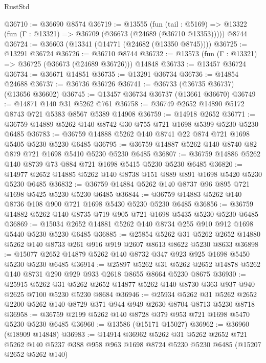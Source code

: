 \begin{lexlean}{RustStd}
\begin{coremodule}
@36710 := @36690 @8574
@36719 := @13555
    (fun (tail : @5169) => @13322 (fun (Γ : @13321) => @36709 (@36673 (@24689 (@36710 @13353)))))
    @8744
@36724 := @36603 (@13341 (@14771 (@24682 (@13350 @8745))))
@36725 := @13291 @36724
@36726 := @36710 @8744
@36732 := @13573 (fun (Γ : @13321) => @36725 (@36673 (@24689 @36726))) @14848
@36733 := @13457 @36724
@36734 := @36671 @14851
@36735 := @13291 @36734
@36736 := @14854 @24688
@36737 := @36736 @36726
@36741 := @36733 (@36735 @36737) (@13656 @36602)
@36745 := @13457 @36734 @36737 (@13661 @36670)
@36749 := @14871 @140 @31 @5262 @761
@36758 := @36749 @2652 @14890 @5172 @8743 @721 @5383 @8567 @5389 @14908
@36759 := @14918 @2652
@36771 := @36759 @14889 @5262 @140 @8742 @30 @755 @721 @1698 @5399 @5230 @5230 @6485
@36783 := @36759 @14888 @5262 @140 @8741 @22 @874 @721 @1698 @5405 @5230 @5230 @6485
@36795 := @36759 @14887 @5262 @140 @8740 @82 @879 @721 @1698 @5410 @5230 @5230 @6485
@36807 := @36759 @14886 @5262 @140 @8739 @73 @884 @721 @1698 @5415 @5230 @5230 @6485
@36820 := @14977 @2652 @14885 @5262 @140 @8738 @151 @889 @891 @1698 @5420 @5230 @5230 @6485
@36832 := @36759 @14884 @5262 @140 @8737 @96 @895 @721 @1698 @5425 @5230 @5230 @6485
@36844 := @36759 @14883 @5262 @140 @8736 @108 @900 @721 @1698 @5430 @5230 @5230 @6485
@36856 := @36759 @14882 @5262 @140 @8735 @719 @905 @721 @1698 @5435 @5230 @5230 @6485
@36869 := @15034 @2652 @14881 @5262 @140 @8734 @255 @910 @912 @1698 @5440 @5230 @5230 @6485
@36885 := @25854
    @5262
    @31
    @5262
    @2652
    @14880
    @5262
    @140
    @8733
    @261
    @916
    @919
    @2607
    @8613
    @8622
    @5230
    @8633
@36898 := @15077 @2652 @14879 @5262 @140 @8732 @347 @923 @925 @1698 @5450 @5230 @5230 @6485
@36914 := @25897
    @5262
    @31
    @5262
    @2652
    @14878
    @5262
    @140
    @8731
    @290
    @929
    @933
    @2618
    @8655
    @8664
    @5230
    @8675
@36930 := @25915
    @5262
    @31
    @5262
    @2652
    @14877
    @5262
    @140
    @8730
    @363
    @937
    @940
    @2625
    @7100
    @5230
    @5230
    @8684
@36946 := @25934
    @5262
    @31
    @5262
    @2652
    @2200
    @5262
    @140
    @8729
    @371
    @944
    @949
    @2630
    @8704
    @8713
    @5230
    @8718
@36958 := @36759 @2199 @5262 @140 @8728 @379 @953 @721 @1698 @5470 @5230 @5230 @6485
@36960 := @13586 (@15171 @15027)
@36962 := @36960 (@18909 @14848)
@36983 := @14914
    @36962
    @5262
    @31
    @5262
    @2652
    @721
    @5262
    @140
    @5237
    @388
    @958
    @963
    @1698
    @8724
    @5230
    @5230
    @6485
    (@15207 @2652 @5262 @140)

\end{coremodule}
\end{lexlean}
